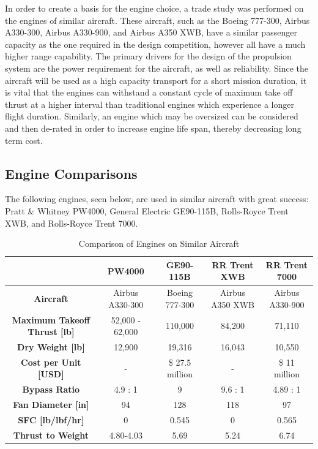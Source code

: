 


In order to create a basis for the engine choice, a trade study was performed on the engines of similar aircraft. These aircraft, such as the Boeing 777-300, Airbus A330-300, Airbus A330-900, and Airbus A350 XWB, have a similar passenger capacity as the one required in the design competition, however all have a much higher range capability. The primary drivers for the design of the propulsion system are the power requirement for the aircraft, as well as reliability. Since the aircraft will be used as a high capacity transport for a short mission duration, it is vital that the engines can withstand a constant cycle of maximum take off thrust at a higher interval than traditional engines which experience a longer flight duration. Similarly, an engine which may be oversized can be considered and then de-rated in order to increase engine life span, thereby decreasing long term cost.

\subsection{Engine Comparisons}

The following engines, seen below, are used in similar aircraft with great success: Pratt \& Whitney PW4000, General Electric GE90-115B, Rolls-Royce Trent XWB, and Rolls-Royce Trent 7000.

\begin{table}[!h]
    \centering
        \caption{Comparison of Engines on Similar Aircraft}
    \begin{tabular}{|c||c|c|c|c|}\toprule
         & \textbf{PW4000} & \textbf{GE90-115B} & \textbf{RR Trent XWB} & \textbf{RR Trent 7000} \\\hline \hline
         \textbf{Aircraft} & Airbus A330-300 & Boeing 777-300 & Airbus A350 XWB & Airbus A330-900\\ \hline
         \textbf{Maximum Takeoff Thrust [lb]} & 52,000 - 62,000 \cite{PW} & 110,000  \cite{ge90} & 84,200  \cite{xwb} & 71,110  \cite{butterworth}\\ \hline
         \textbf{Dry Weight [lb]} & 12,900  \cite{FAApw} & 19,316  \cite{ge90} & 16,043  \cite{xwb2} & 10,550 \cite{butterworth} \\ \hline
         \textbf{Cost per Unit [USD]} & - & \$ 27.5 million \cite{gecost} & - & \$ 11 million \cite{butterworth} \\ \hline
         \textbf{Bypass Ratio} & 4.9 : 1 \cite{PW} & 9 \cite{safran} & 9.6 : 1 \cite{xwb} & 4.89 : 1 \cite{butterworth} \\ \hline
         \textbf{Fan Diameter [in]} & 94 \cite{PW} & 128 \cite{ge} & 118 \cite{xwb} &  97 \cite{butterworth}\\ \hline
         \textbf{SFC [lb/lbf/hr]} & 0 & 0.545 \cite{butterworth} & 0 &  0.565 \cite{butterworth} \\ \hline
         \textbf{Thrust to Weight} & 4.80-4.03 & 5.69 & 5.24 & 6.74 \\ \bottomrule
    \end{tabular}
    \label{tab:enginecomp}
\end{table}


